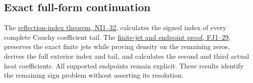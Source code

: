 \documentclass[
  10pt,
  a4paper,
]{article}
\begin{document}
\subsection{Exact full-form
continuation}\label{exact-full-form-continuation}

The \href{CAUCHY_REFLECTION_INDEX_DERIVATION.md}{reflection-index
theorem, NI1--32}, calculates the signed index of every complete Cauchy
coefficient tail. The
\href{FINITE_JET_COMPLEMENT_AND_HEAT_TRUNCATION.md}{finite-jet and
endpoint proof, FJ1--29}, preserves the exact finite jets while proving
density on the remaining zeros, derives the full exterior index and
tail, and calculates the second and third actual heat coefficients. All
supported endpoints remain explicit. These results identify the
remaining sign problem without asserting its resolution.
\end{document}

